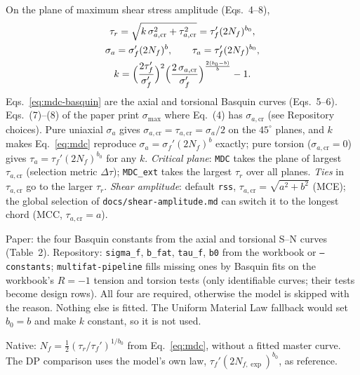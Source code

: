  On the plane of maximum shear stress amplitude (Eqs.~4--8),
\begin{gather}
\tau_r = \sqrt{k\,\sigma_{a,\mathrm{cr}}^2 + \tau_{a,\mathrm{cr}}^2} = \tau_f'(2N_f)^{b_0} ,
\label{eq:mdc}\\
\sigma_a = \sigma_f'(2N_f)^{b},\qquad \tau_a = \tau_f'(2N_f)^{b_0} , \label{eq:mdc-basquin}\\
k = \Bigl(\frac{2\tau_f'}{\sigma_f'}\Bigr)^2\Bigl(\frac{2\,\sigma_{a,\mathrm{cr}}}{\sigma_f'}\Bigr)^{\frac{2(b_0-b)}{b}} - 1 .
\label{eq:mdc-k}
\end{gather}
Eqs.~\eqref{eq:mdc-basquin} are the axial and torsional Basquin curves (Eqs.~5--6). Eqs.~(7)--(8) of
the paper print $\sigma_{\max}$ where Eq.~(4) has $\sigma_{a,\mathrm{cr}}$ (see Repository choices).
Pure uniaxial $\sigma_a$ gives $\sigma_{a,\mathrm{cr}}=\tau_{a,\mathrm{cr}}=\sigma_a/2$ on the
$45^\circ$ planes, and $k$ makes Eq.~\eqref{eq:mdc} reproduce $\sigma_a=\sigma_f'(2N_f)^b$ exactly; pure
torsion ($\sigma_{a,\mathrm{cr}}=0$) gives $\tau_a=\tau_f'(2N_f)^{b_0}$ for any $k$. \emph{Critical
plane}: \texttt{MDC} takes the plane of largest $\tau_{a,\mathrm{cr}}$ (selection metric
$\Delta\tau$); \texttt{MDC\_ext} takes the largest $\tau_r$ over all planes. \emph{Ties} in
$\tau_{a,\mathrm{cr}}$ go to the larger $\tau_r$. \emph{Shear amplitude}: default \texttt{rss},
$\tau_{a,\mathrm{cr}}=\sqrt{a^2+b^2}$ (MCE); the global selection of \texttt{docs/shear-amplitude.md}
can switch it to the longest chord (MCC, $\tau_{a,\mathrm{cr}}=a$).

 Paper: the four Basquin constants from the axial and torsional S--N
curves (Table~2). Repository: \texttt{sigma\_f}, \texttt{b\_fat}, \texttt{tau\_f}, \texttt{b0} from
the workbook or \texttt{--constants}; \texttt{multifat-pipeline} fills missing ones by Basquin fits on
the workbook's $R=-1$ tension and torsion tests (only identifiable curves; their tests become design
rows). All four are required, otherwise the model is skipped with the reason. Nothing else is fitted. The Uniform Material
Law fallback would set $b_0=b$ and make $k$ constant, so it is not used.

 Native: $N_f=\tfrac12(\tau_r/\tau_f')^{1/b_0}$ from Eq.~\eqref{eq:mdc}, without a fitted
master curve. The DP comparison uses the model's own law, $\tau_f'(2N_{f,\exp})^{b_0}$, as reference.

